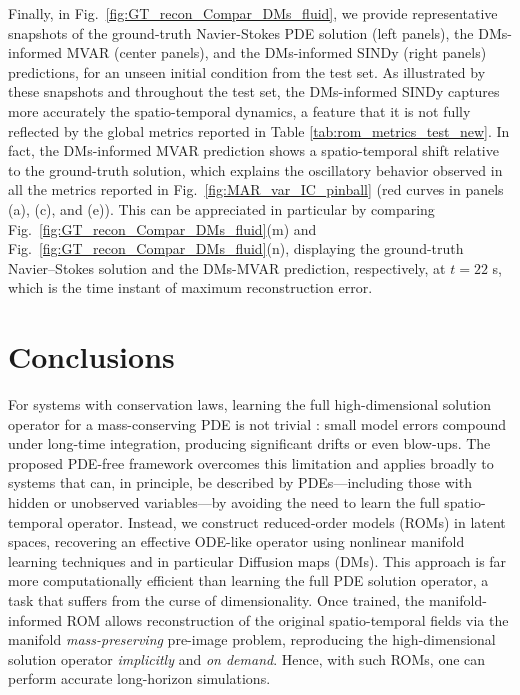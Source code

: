 \documentclass{article}
\begin{document}
Finally, in Fig.~\ref{fig:GT_recon_Compar_DMs_fluid}, we provide representative snapshots of the ground-truth Navier-Stokes PDE solution (left panels), the DMs-informed MVAR (center panels), and the DMs-informed SINDy (right panels) predictions, for an unseen initial condition from the test set. As illustrated by these snapshots and throughout the test set, the DMs-informed SINDy captures more accurately the spatio-temporal dynamics, a feature that it is not fully reflected by the global metrics reported in Table \ref{tab:rom_metrics_test_new}. In fact, the DMs-informed MVAR prediction shows a spatio-temporal shift relative to the ground-truth solution, which explains the oscillatory behavior observed in all the metrics reported in Fig.~\ref{fig:MAR_var_IC_pinball} (red curves in panels (a), (c), and (e)). This can be appreciated in particular by comparing Fig.~\ref{fig:GT_recon_Compar_DMs_fluid}(m) and Fig.~\ref{fig:GT_recon_Compar_DMs_fluid}(n), displaying the ground-truth Navier–Stokes solution and the DMs-MVAR prediction, respectively, at 
$t=22$ s, which is the time instant of maximum reconstruction error.


\section{Conclusions}
\label{sec:conclusions}
For systems with conservation laws, learning the full high-dimensional solution operator for a mass-conserving PDE is not trivial \cite{jagtap2020conservative,huang2023limitations,chen2024learning,patsatzis2025gorinns}: small model errors compound under long-time integration, producing significant drifts or even blow-ups.
The proposed PDE-free framework overcomes this limitation and applies broadly to systems that can, in principle, be described by PDEs—including those with hidden or unobserved variables—by avoiding the need to learn the full spatio-temporal operator. Instead, we construct reduced-order models (ROMs) in latent spaces, recovering an effective ODE-like operator using nonlinear manifold learning techniques and in particular Diffusion maps (DMs). This approach is far more computationally efficient than learning the full PDE solution operator, a task that suffers from the curse of dimensionality. Once trained, the manifold-informed ROM allows reconstruction of the original spatio-temporal fields via the manifold \textit{mass-preserving} pre-image problem, reproducing the high-dimensional solution operator \emph{implicitly} and \emph{on demand}. 
Hence, with such ROMs, one can perform accurate long-horizon simulations.
\end{document}
